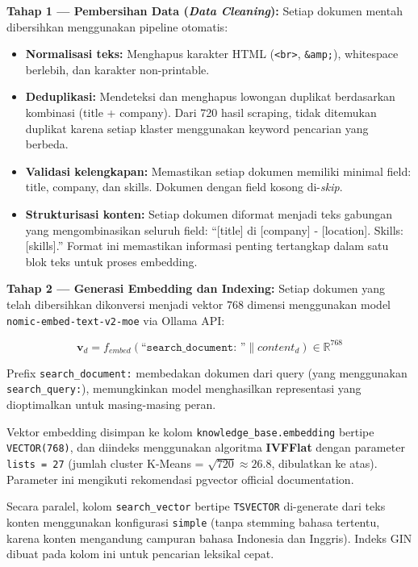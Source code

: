 \textbf{Tahap 1 --- Pembersihan Data (\textit{Data Cleaning}):}
Setiap dokumen mentah dibersihkan menggunakan pipeline otomatis:
\begin{itemize}[noitemsep]
  \item \textbf{Normalisasi teks:} Menghapus karakter HTML (\texttt{<br>}, \texttt{\&amp;}),
    whitespace berlebih, dan karakter non-printable.
  \item \textbf{Deduplikasi:} Mendeteksi dan menghapus lowongan duplikat berdasarkan
    kombinasi (title + company). Dari 720 hasil scraping, tidak ditemukan duplikat
    karena setiap klaster menggunakan keyword pencarian yang berbeda.
  \item \textbf{Validasi kelengkapan:} Memastikan setiap dokumen memiliki minimal
    field: title, company, dan skills. Dokumen dengan field kosong di-\textit{skip}.
  \item \textbf{Strukturisasi konten:} Setiap dokumen diformat menjadi teks gabungan
    yang mengombinasikan seluruh field: ``[title] di [company] - [location].
    Skills: [skills].'' Format ini memastikan informasi
    penting tertangkap dalam satu blok teks untuk proses embedding.
\end{itemize}

\textbf{Tahap 2 --- Generasi Embedding dan Indexing:}
Setiap dokumen yang telah dibersihkan dikonversi menjadi vektor 768 dimensi menggunakan
model \texttt{nomic-embed-text-v2-moe} via Ollama API:

\begin{equation}
  \mathbf{v}_d = f_{embed}(\texttt{``search\_document: ''} \| content_d) \in \mathbb{R}^{768}
  \label{eq:doc_embedding}
\end{equation}

\noindent Prefix \texttt{search\_document:} membedakan dokumen dari query (yang
menggunakan \texttt{search\_query:}), memungkinkan model menghasilkan representasi
yang dioptimalkan untuk masing-masing peran.

Vektor embedding disimpan ke kolom \texttt{knowledge\_base.embedding} bertipe
\texttt{VECTOR(768)}, dan diindeks menggunakan algoritma \textbf{IVFFlat}
dengan parameter \texttt{lists = 27} (jumlah cluster K-Means = $\sqrt{720} \approx 26.8$,
dibulatkan ke atas). Parameter ini mengikuti rekomendasi pgvector official documentation.

Secara paralel, kolom \texttt{search\_vector} bertipe \texttt{TSVECTOR} di-generate
dari teks konten menggunakan konfigurasi \texttt{simple} (tanpa stemming bahasa tertentu,
karena konten mengandung campuran bahasa Indonesia dan Inggris). Indeks GIN
dibuat pada kolom ini untuk pencarian leksikal cepat.

